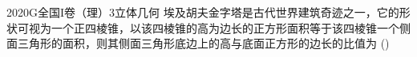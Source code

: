 
\begin{problem}{2020}{G}{全国I卷（理）}{3}{立体几何}
埃及胡夫金字塔是古代世界建筑奇迹之一，它的形状可视为一个正四棱锥，以该四棱锥的高为边长的正方形面积等于该四棱锥一个侧面三角形的面积，则其侧面三角形底边上的高与底面正方形的边长的比值为 (\hspace{1cm})
\begin{choices}
\end{choices}
\end{problem}

\begin{answer}

\end{answer}

\begin{solutions}

\end{solutions}